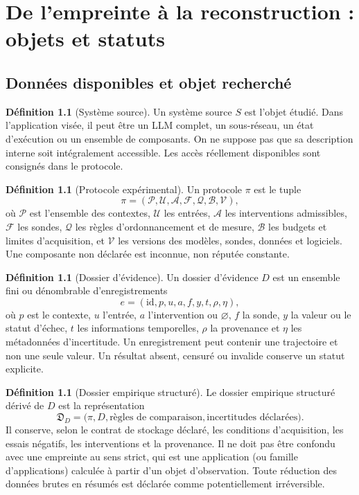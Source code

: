 \documentclass[11pt,oneside]{book}
\theoremstyle{definition}
\newtheorem{definition}[theoreme]{Définition}
\theoremstyle{remark}
\newcommand{\Pcal}{\mathcal P}
\newcommand{\Fcal}{\mathcal F}
\newcommand{\Acal}{\mathcal A}
\newcommand{\Ucal}{\mathcal U}
\newcommand{\1}{\mathbf 1}
\begin{document}
\chapter{De l'empreinte à la reconstruction : objets et statuts}
\section{Données disponibles et objet recherché}
\begin{definition}[Système source]
Un système source $S$ est l'objet étudié. Dans l'application visée, il peut être un LLM complet, un sous-réseau, un état d'exécution ou un ensemble de composants. On ne suppose pas que sa description interne soit intégralement accessible. Les accès réellement disponibles sont consignés dans le protocole.
\end{definition}

\begin{definition}[Protocole expérimental]
Un protocole $\pi$ est le tuple
\[
\pi=(\Pcal,\Ucal,\Acal,\Fcal,\mathcal Q,\mathcal B,\mathcal V),
\]
où $\Pcal$ est l'ensemble des contextes, $\Ucal$ les entrées, $\Acal$ les interventions admissibles, $\Fcal$ les sondes, $\mathcal Q$ les règles d'ordonnancement et de mesure, $\mathcal B$ les budgets et limites d'acquisition, et $\mathcal V$ les versions des modèles, sondes, données et logiciels. Une composante non déclarée est inconnue, non réputée constante.
\end{definition}

\begin{definition}[Dossier d'évidence]
Un dossier d'évidence $D$ est un ensemble fini ou dénombrable d'enregistrements
\[
e=(\mathrm{id},p,u,a,f,y,t,\rho,\eta),
\]
où $p$ est le contexte, $u$ l'entrée, $a$ l'intervention ou $\varnothing$, $f$ la sonde, $y$ la valeur ou le statut d'échec, $t$ les informations temporelles, $\rho$ la provenance et $\eta$ les métadonnées d'incertitude. Un enregistrement peut contenir une trajectoire et non une seule valeur. Un résultat absent, censuré ou invalide conserve un statut explicite.
\end{definition}

\begin{definition}[Dossier empirique structuré]
Le dossier empirique structuré dérivé de $D$ est la représentation
\[
\mathfrak D_D=\bigl(\pi,D,\text{règles de comparaison},\text{incertitudes déclarées}\bigr).
\]
Il conserve, selon le contrat de stockage déclaré, les conditions d’acquisition, les essais négatifs, les interventions et la provenance. Il ne doit pas être confondu avec une empreinte au sens strict, qui est une application (ou famille d’applications) calculée à partir d’un objet d’observation. Toute réduction des données brutes en résumés est déclarée comme potentiellement irréversible.
\end{definition}
\end{document}
